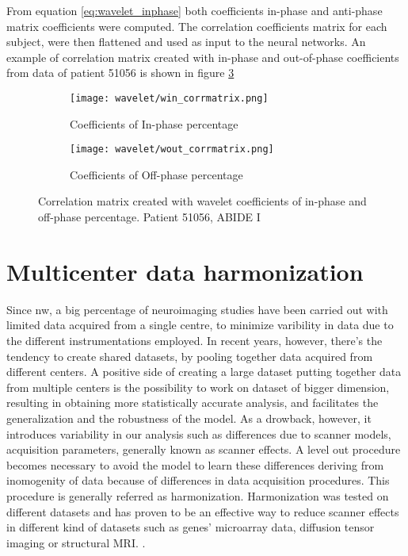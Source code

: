 \documentclass[11pt]{report}
\begin{document}
From equation \ref{eq:wavelet_inphase} both coefficients in-phase and anti-phase matrix coefficients were computed.
The correlation coefficients matrix for each subject, were then flattened and used as input to the neural networks.
An example of correlation matrix created with in-phase and out-of-phase coefficients from data of patient 51056 is shown in figure \ref{fig:win_wout}



\begin{figure}
\centering
\begin{subfigure}{0.45\textwidth}
\texttt{[image: wavelet/win\_corrmatrix.png]}
\caption{Coefficients of In-phase percentage}
\label{}
\end{subfigure}
\begin{subfigure}{0.45\textwidth}
\texttt{[image: wavelet/wout\_corrmatrix.png]}
\caption{Coefficients of Off-phase percentage}
\label{}
\end{subfigure}
\caption{Correlation matrix created with wavelet coefficients of in-phase and off-phase percentage. Patient 51056, ABIDE I }
\label{fig:win_wout}
\end{figure}



\newpage


\chapter{Multicenter data harmonization}\label{chap:harmonization_theory}
Since nw, a big percentage of neuroimaging studies have been carried out with limited data acquired from a single centre, to minimize varibility in data due to the different instrumentations employed.
In recent years, however, there's the tendency to create shared datasets, by pooling together data acquired from different centers.
A positive side of creating a large dataset putting together data from multiple centers is the possibility to work on dataset of bigger dimension, resulting in obtaining more statistically accurate analysis, and facilitates the generalization and the robustness of the model.
As a drowback, however, it introduces variability in our analysis such as differences due to scanner models, acquisition parameters, generally known as scanner effects.
A level out procedure becomes necessary to avoid the model to learn these differences deriving from inomogenity of data because of differences in data acquisition procedures.
This procedure is generally referred as harmonization.
Harmonization was tested on different datasets and has proven to be an effective way to reduce scanner effects  in different kind of datasets such as genes' microarray data, diffusion tensor imaging or structural MRI. \cite{johnson-2006} \cite{fortin-2017} \cite{lombardi2020}.
\end{document}
